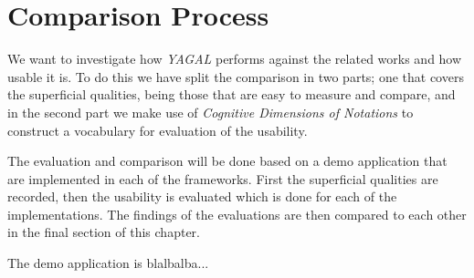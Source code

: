 \section{Comparison Process}
We want to investigate how \textit{YAGAL} performs against the related works and how usable it is. To do this we have split the comparison in two parts; one that covers the superficial qualities, being those that are easy to measure and compare, and in the second part we make use of \textit{Cognitive Dimensions of Notations} to construct a vocabulary for evaluation of the usability.

The evaluation and comparison will be done based on a demo application that are implemented in each of the frameworks. First the superficial qualities are recorded, then the usability is evaluated which is done for each of the implementations. The findings of the evaluations are then compared to each other in the final section of this chapter.

The demo application is blalbalba...
